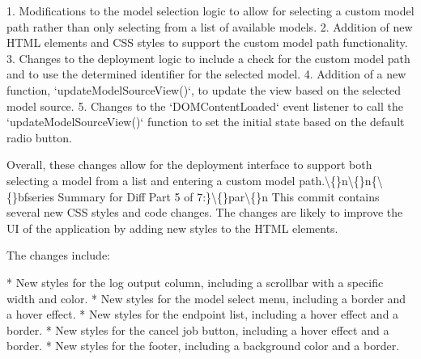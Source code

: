 \documentclass{article}
\begin{document}
{1. Modifications to the model selection logic to allow for selecting a custom model path rather than only selecting from a list of available models.
2. Addition of new HTML elements and CSS styles to support the custom model path functionality.
3. Changes to the deployment logic to include a check for the custom model path and to use the determined identifier for the selected model.
4. Addition of a new function, `updateModelSourceView()`, to update the view based on the selected model source.
5. Changes to the `DOMContentLoaded` event listener to call the `updateModelSourceView()` function to set the initial state based on the default radio button.

Overall, these changes allow for the deployment interface to support both selecting a model from a list and entering a custom model path.\textbackslash\{\}n\textbackslash\{\}n\{\textbackslash\{\}bfseries Summary for Diff Part 5 of 7:\}\textbackslash\{\}par\textbackslash\{\}n  This commit contains several new CSS styles and code changes. The changes are likely to improve the UI of the application by adding new styles to the HTML elements.

The changes include:

* New styles for the log output column, including a scrollbar with a specific width and color.
* New styles for the model select menu, including a border and a hover effect.
* New styles for the endpoint list, including a hover effect and a border.
* New styles for the cancel job button, including a hover effect and a border.
* New styles for the footer, including a background color and a border.

}
\end{document}
